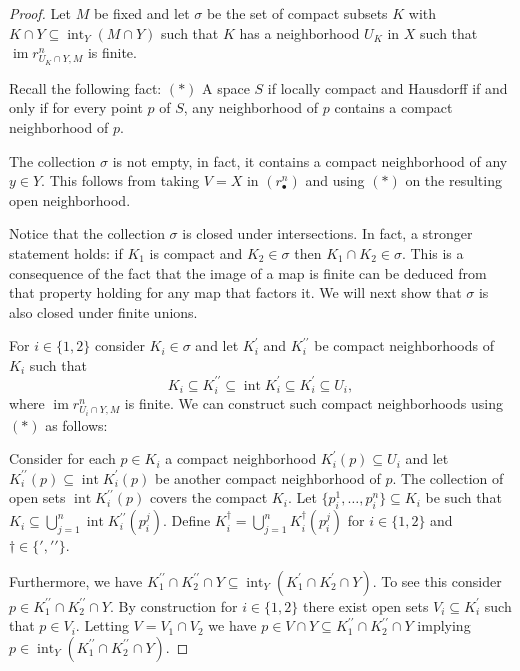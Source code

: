 \documentclass{amsart}
\newcommand{\dprime}{{\prime\prime}}
\DeclareMathOperator{\im}{im}
\DeclareMathOperator{\interior}{int}
\begin{document}
	\begin{proof}
		Let $M$ be fixed and let $\sigma$ be the set of compact subsets $K$ with $K \cap Y \subseteq \interior_Y(M \cap Y)$ such that $K$ has a neighborhood $U_K$ in $X$ such that $\im r^n_{U_K \cap Y, M}$ is finite.
		
		Recall the following fact:
		$(\ast)$ A space $S$ if locally compact and Hausdorff if and only if for every point $p$ of $S$, any neighborhood of $p$ contains a compact neighborhood of $p$.
		
		The collection $\sigma$ is not empty, in fact, it contains a compact neighborhood of any $y \in Y$. This follows from taking $V = X$ in $(r_\bullet^n)$ and using $(\ast)$ on the resulting open neighborhood.
		
		Notice that the collection $\sigma$ is closed under intersections. In fact, a stronger statement holds: if $K_1$ is compact and $K_2 \in \sigma$ then $K_1 \cap K_2 \in \sigma$. This is a consequence of the fact that the image of a map is finite can be deduced from that property holding for any map that factors it. We will next show that $\sigma$ is also closed under finite unions.
		
		For $i \in \{1, 2\}$ consider $K_i \in \sigma$ and let $K_i^\prime$ and $K_i^\dprime$ be compact neighborhoods of $K_i$ such that
		\begin{equation*}
		K_i \subseteq K_i^\dprime \subseteq \interior K_i^\prime \subseteq K_i^\prime \subseteq U_i,
		\end{equation*}
		where $\im r^n_{U_i \cap Y, M}$ is finite. 
		We can construct such compact neighborhoods using $(\ast)$ as follows:
		
		Consider for each $p \in K_i$ a compact neighborhood $K^\prime_i(p) \subseteq U_i$ and let $K_i^\dprime(p) \subseteq \interior K_i^\prime(p)$ be another compact neighborhood of $p$. The collection of open sets $\interior K_i^\dprime(p)$ covers the compact $K_i$. Let $\{p_i^{1}, \dots, p^{n}_i\} \subseteq K_i$ be such that $K_i \subseteq \bigcup_{j=1}^n \interior K^\dprime_i(p^j_i)$. Define $K_i^\dag = \bigcup_{j=1}^n K^\dag_i(p^j_i)$ for $i \in \{1,2\}$ and $\dag \in \{\prime, \dprime\}$.
		
		Furthermore, we have $K^\dprime_1 \cap K^\dprime_2 \cap Y \subseteq \interior_Y(K_1^\prime \cap K_2^\prime \cap Y)$. To see this consider $p \in K^\dprime_1 \cap K^\dprime_2 \cap Y$. By construction for $i \in \{1, 2\}$ there exist open sets $V_i \subseteq K_i^\prime$ such that $p \in V_i$. Letting $V = V_1 \cap V_2$ we have $p \in V \cap Y \subseteq K^\dprime_1 \cap K^\dprime_2 \cap Y$ implying $p \in \interior_Y(K^\dprime_1 \cap K^\dprime_2 \cap Y)$.
		

\end{proof}
\end{document}
